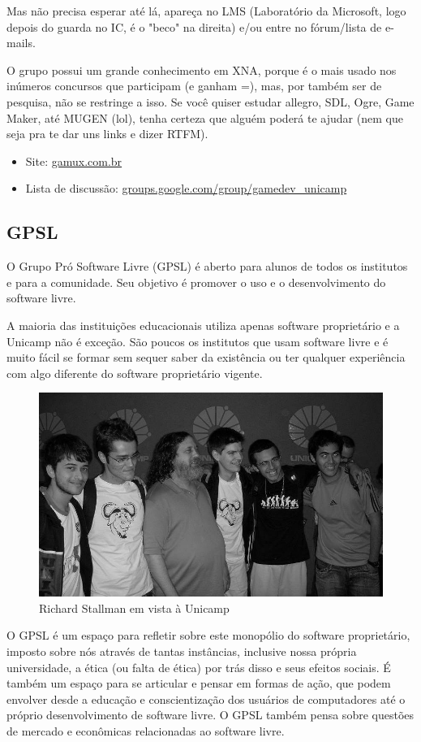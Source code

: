 Mas não precisa esperar até lá, apareça no LMS (Laboratório da Microsoft, logo
depois do guarda no IC, é o "beco" na direita) e/ou entre no fórum/lista de
e-mails.

O grupo possui um grande conhecimento em XNA, porque é o mais usado nos inúmeros
concursos que participam (e ganham =), mas, por também ser de pesquisa, não se
restringe a isso. Se você quiser estudar allegro, SDL, Ogre, Game Maker, até
MUGEN (lol), tenha certeza que alguém poderá te ajudar (nem que seja pra te dar
uns links e dizer RTFM).

\begin{itemize}
\item  Site: \url{gamux.com.br}
\item  Lista de discussão: \url{groups.google.com/group/gamedev_unicamp}
\end{itemize}

\subsection{GPSL}

O Grupo Pró Software Livre (GPSL) é aberto para alunos de todos os institutos
e para a comunidade. Seu objetivo é promover o uso e o desenvolvimento do
software livre.

A maioria das instituições educacionais utiliza apenas software
proprietário e a Unicamp não é exceção. São poucos os institutos que usam
software livre e é muito fácil se formar sem sequer saber da existência ou ter
qualquer experiência com algo diferente do software proprietário vigente.

\begin{figure}[h!]
    \centering
    \includegraphics[scale=0.36, keepaspectratio=true]{img/imgs/18-grupos_entidades/stallman2.JPG}
    \caption{Richard Stallman em vista à Unicamp}
\end{figure}
O GPSL é um espaço para refletir sobre este monopólio do software proprietário,
imposto sobre nós através de tantas instâncias, inclusive nossa própria
universidade, a ética (ou falta de ética) por trás disso e seus efeitos sociais.
É também um espaço para se articular e pensar em formas de ação, que podem
envolver desde a educação e conscientização dos usuários de computadores até
o próprio desenvolvimento de software livre. O GPSL também pensa sobre
questões de mercado e econômicas relacionadas ao software livre.

